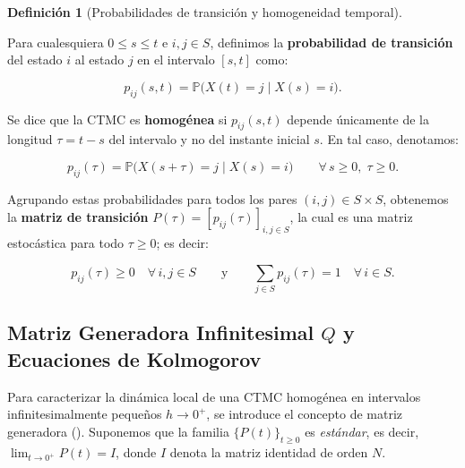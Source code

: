 \documentclass[
  spanish,
  us-letterpaper,
]{scrreprt}
\theoremstyle{definition}
\newtheorem{definition}{Definición}[chapter]
\theoremstyle{remark}
\begin{document}
\begin{definition}[Probabilidades de transición y homogeneidad
temporal]\protect\hypertarget{def-probabilidad-transicion-homogeneidad}{}\label{def-probabilidad-transicion-homogeneidad}

Para cualesquiera \(0 \le s \le t\) e \(i, j \in S\), definimos la
\textbf{probabilidad de transición} del estado \(i\) al estado \(j\) en
el intervalo \([s, t]\) como:

\[
p_{ij}(s, t) = \mathbb{P}\bigl(X(t) = j \mid X(s) = i\bigr).
\]

Se dice que la CTMC es \textbf{homogénea} si \(p_{ij}(s, t)\) depende
únicamente de la longitud \(\tau = t - s\) del intervalo y no del
instante inicial \(s\). En tal caso, denotamos:

\[
p_{ij}(\tau) = \mathbb{P}\bigl(X(s + \tau) = j \mid X(s) = i\bigr) \qquad \forall\, s \ge 0,\; \tau \ge 0.
\]

Agrupando estas probabilidades para todos los pares
\((i, j) \in S \times S\), obtenemos la \textbf{matriz de transición}
\(P(\tau) = [p_{ij}(\tau)]_{i,j \in S}\), la cual es una matriz
estocástica para todo \(\tau \ge 0\); es decir:

\[
p_{ij}(\tau) \ge 0 \quad \forall\, i, j \in S \qquad \text{y} \qquad \sum_{j \in S} p_{ij}(\tau) = 1 \quad \forall\, i \in S.
\]

\end{definition}

\subsection{\texorpdfstring{Matriz Generadora Infinitesimal \(Q\) y
Ecuaciones de
Kolmogorov}{Matriz Generadora Infinitesimal Q y Ecuaciones de Kolmogorov}}\label{matriz-generadora-infinitesimal-q-y-ecuaciones-de-kolmogorov}

Para caracterizar la dinámica local de una CTMC homogénea en intervalos
infinitesimalmente pequeños \(h \to 0^+\), se introduce el concepto de
matriz generadora (). Suponemos
que la familia \(\{P(t)\}_{t \ge 0}\) es \emph{estándar}, es decir,
\(\lim_{t \to 0^+} P(t) = I\), donde \(I\) denota la matriz identidad de
orden \(N\).
\end{document}
